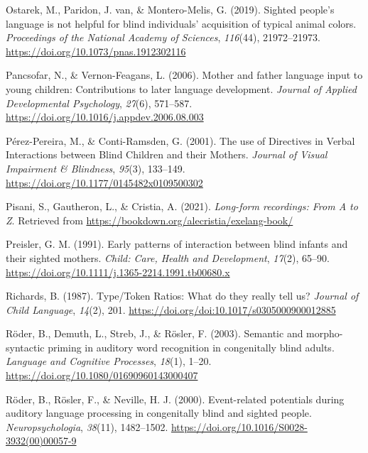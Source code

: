 \documentclass[
  man]{apa6}
\newlength{\cslhangindent}
\newlength{\cslentryspacingunit} %
\newenvironment{CSLReferences}[2] %
 {%
  \setlength{\parindent}{0pt}
  \ifodd #1
  \let\oldpar\par
  \def\par{\hangindent=\cslhangindent\oldpar}
  \fi
  \setlength{\parskip}{#2\cslentryspacingunit}
 }%
 {}
\begin{document}
\begin{CSLReferences}{1}{0}
\leavevmode{}%
Ostarek, M., Paridon, J. van, \& Montero-Melis, G. (2019). Sighted people's language is not helpful for blind individuals' acquisition of typical animal colors. \emph{Proceedings of the National Academy of Sciences}, \emph{116}(44), 21972--21973. \url{https://doi.org/10.1073/pnas.1912302116}

\leavevmode{}%
Pancsofar, N., \& Vernon-Feagans, L. (2006). Mother and father language input to young children: {Contributions} to later language development. \emph{Journal of Applied Developmental Psychology}, \emph{27}(6), 571--587. \url{https://doi.org/10.1016/j.appdev.2006.08.003}

\leavevmode{}%
Pérez-Pereira, M., \& Conti-Ramsden, G. (2001). The use of {Directives} in {Verbal} {Interactions} between {Blind} {Children} and their {Mothers}. \emph{Journal of Visual Impairment \& Blindness}, \emph{95}(3), 133--149. \url{https://doi.org/10.1177/0145482x0109500302}

\leavevmode{}%
Pisani, S., Gautheron, L., \& Cristia, A. (2021). \emph{Long-form recordings: {From} {A} to {Z}}. Retrieved from \url{https://bookdown.org/alecristia/exelang-book/}

\leavevmode{}%
Preisler, G. M. (1991). Early patterns of interaction between blind infants and their sighted mothers. \emph{Child: Care, Health and Development}, \emph{17}(2), 65--90. \url{https://doi.org/10.1111/j.1365-2214.1991.tb00680.x}

\leavevmode{}%
Richards, B. (1987). Type/{Token} {Ratios}: What do they really tell us? \emph{Journal of Child Language}, \emph{14}(2), 201. \url{https://doi.org/doi:10.1017/s0305000900012885}

\leavevmode{}%
Röder, B., Demuth, L., Streb, J., \& Rösler, F. (2003). Semantic and morpho-syntactic priming in auditory word recognition in congenitally blind adults. \emph{Language and Cognitive Processes}, \emph{18}(1), 1--20. \url{https://doi.org/10.1080/01690960143000407}

\leavevmode{}%
Röder, B., Rösler, F., \& Neville, H. J. (2000). Event-related potentials during auditory language processing in congenitally blind and sighted people. \emph{Neuropsychologia}, \emph{38}(11), 1482--1502. \url{https://doi.org/10.1016/S0028-3932(00)00057-9}


\end{CSLReferences}
\end{document}
